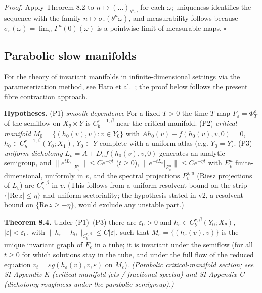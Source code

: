 \documentclass[11pt,a4paper]{article}
\theoremstyle{plain}
\theoremstyle{definition}
\theoremstyle{remark}
\numberwithin{equation}{section}
\numberwithin{figure}{section}
\begin{document}
\textit{Proof.} Apply Theorem 8.2 to $n\mapsto(\ldots)_{\theta^n\omega}$ for each $\omega$; uniqueness identifies the sequence with the family $n\mapsto\sigma_\varepsilon(\theta^n\omega)$, and measurability follows because $\sigma_\varepsilon(\omega)=\lim_n\Gamma^n(0)(\omega)$ is a pointwise limit of measurable maps. $\square$

\subsection{Parabolic slow manifolds}

For the theory of invariant manifolds in infinite-dimensional settings via the parameterization method, see Haro et al.~\cite{har16}; the proof below follows the present fibre contraction approach.

\textbf{Hypotheses.} (P1) \textit{smooth dependence} For a fixed $T>0$ the time-$T$ map $F_\varepsilon=\Phi^\varepsilon_T$ of the semiflow on $X_\theta\times Y$ is $C^{r+1,\beta}_b$ near the critical manifold. (P2) \textit{critical manifold} $M_0=\{(h_0(v),v):v\in Y_0\}$ with $Ah_0(v)+f(h_0(v),v,0)=0$, $h_0\in C^{r+1,\beta}_b(Y_0;X_1)$, $Y_0\subset Y$ complete with a uniform atlas (e.g. $Y_0=Y$). (P3) \textit{uniform dichotomy} $L_v=A+D_uf(h_0(v),v,0)$ generates an analytic semigroup, and $\|e^{tL_v}|_{E^s_v}\|\le Ce^{-\eta t}$ ($t\ge0$), $\|e^{-tL_v}|_{E^u_v}\|\le Ce^{-\eta t}$ with $E^u_v$ finite-dimensional, uniformly in $v$, and the spectral projections $P^{s,u}_v$ (Riesz projections of $L_v$) are $C^{r,\beta}_b$ in $v$. (This follows from a uniform resolvent bound on the strip $\{|\mathrm{Re}\,z|\le\eta\}$ and uniform sectoriality; the hypothesis stated in v2, a resolvent bound on $\{\mathrm{Re}\,z\ge-\eta\}$, would exclude any unstable part.)

\textbf{Theorem 8.4.} Under (P1)–(P3) there are $\varepsilon_0>0$ and $h_\varepsilon\in C^{r,\beta}_b(Y_0;X_\theta)$, $|\varepsilon|<\varepsilon_0$, with $\|h_\varepsilon-h_0\|_{C^{r,\beta}_b}\le C|\varepsilon|$, such that $M_\varepsilon=\{(h_\varepsilon(v),v)\}$ is the unique invariant graph of $F_\varepsilon$ in a tube; it is invariant under the semiflow (for all $t\ge0$ for which solutions stay in the tube, and under the full flow of the reduced equation $v_t=\varepsilon g(h_\varepsilon(v),v,\varepsilon)$ on $M_\varepsilon$). \textit{(Parabolic critical-manifold section; see SI Appendix K (critical manifold jets / fractional spectra) and SI Appendix C (dichotomy roughness under the parabolic semigroup).)}
\end{document}
